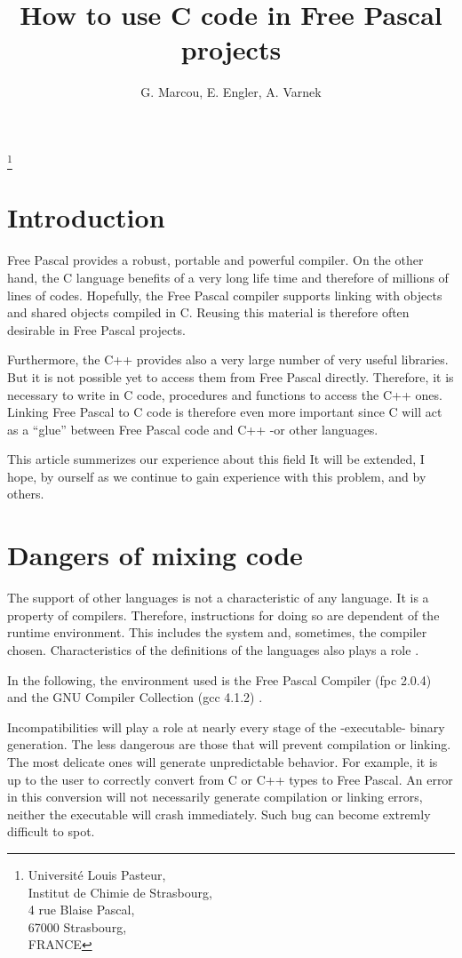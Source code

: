 \documentclass[A4paper]{article}
\title{How to use C code in Free Pascal projects}
\author{G. Marcou, E. Engler, A. Varnek}
\begin{document}
\maketitle\footnote{Universit\'e Louis Pasteur,\\ Institut de Chimie de Strasbourg,\\ 4 rue Blaise Pascal,\\ 67000 Strasbourg,\\ FRANCE}

\section{Introduction}

Free Pascal provides a robust, portable and powerful compiler\cite{FPDoc}. On
the other hand, the C language benefits of a very long life time and
therefore of millions of lines of codes. Hopefully, the Free Pascal
compiler supports linking with objects and shared objects compiled in
C. Reusing this material is therefore often desirable in Free Pascal projects.

Furthermore, the C++ provides also a very large number of very useful
libraries. But it is not possible yet to access them from Free Pascal
directly\cite{FPDoc,FPFor}. Therefore, it is necessary to write in C code,
procedures and functions to access the C++ ones. Linking Free Pascal to C code
is therefore even more important since C will act as a ``glue'' between
Free Pascal code and C++ -or other languages.

This article summerizes our experience about this field
It will be extended, I hope, by ourself as we continue to gain
experience with this problem, and by others.

\section{Dangers of mixing code}

The support of other languages is not a characteristic of any
language. It is a property of compilers. Therefore, instructions for
doing so are dependent of the runtime environment. This includes the system
and, sometimes, the compiler chosen. Characteristics of the definitions of the
languages also plays a role \cite{C++}.

In the following, the environment used is the Free Pascal Compiler (fpc
2.0.4) \cite{FPDoc} and the GNU Compiler Collection (gcc 4.1.2) \cite{gcc}.

Incompatibilities will play a role at nearly every stage of the -executable-
binary generation. The less dangerous are those that will prevent compilation
or linking. The most delicate ones will generate unpredictable behavior. For
example, it is up to the user to correctly convert from C or C++ types to Free
Pascal. An error in this conversion will not necessarily generate compilation
or linking errors, neither the executable will crash immediately. Such bug can
become extremly difficult to spot.
\end{document}
